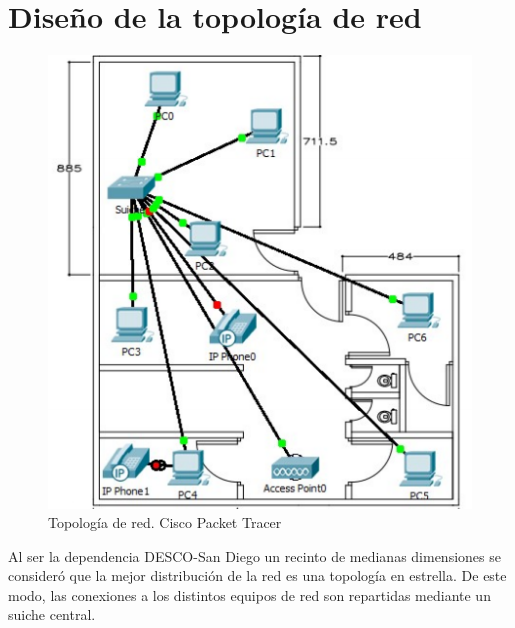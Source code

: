 \documentclass[11pt, a4paper, twosides]{report}
\begin{document}
\chapter{Diseño de la topología de red}
\begin{figure}[h]
    \centering
    \includegraphics[width=1\linewidth]{topo.png}
    \caption{Topología de red. Cisco Packet Tracer}
    \label{fig:topo}
\end{figure}

Al ser la dependencia DESCO-San Diego un recinto de medianas dimensiones se consideró que la mejor distribución de la red es una topología en estrella. De este modo, las conexiones a los distintos equipos de red son repartidas mediante un suiche central.
\end{document}
